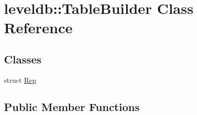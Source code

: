 \hypertarget{classleveldb_1_1_table_builder}{}\section{leveldb\+:\+:Table\+Builder Class Reference}
\label{classleveldb_1_1_table_builder}
\subsection*{Classes}
\begin{DoxyCompactItemize}
\item 
struct \mbox{\hyperlink{structleveldb_1_1_table_builder_1_1_rep}{Rep}}
\end{DoxyCompactItemize}
\subsection*{Public Member Functions}
